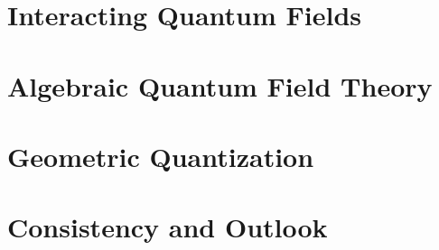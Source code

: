\documentclass[12pt,a4paper]{revtex4-2}
\theoremstyle{definition}
\theoremstyle{remark}
\begin{document}
\part{Interacting Quantum Fields}





\part{Algebraic Quantum Field Theory}





\part{Geometric Quantization}






\part{Consistency and Outlook}





\appendix




\end{document}
